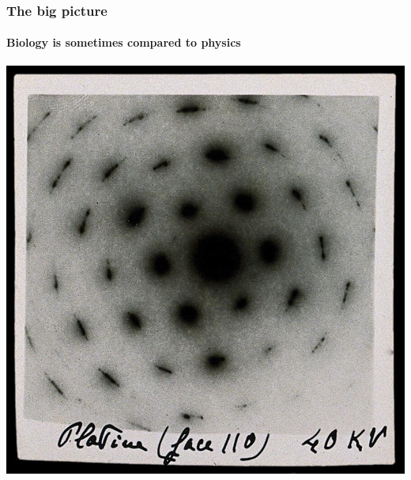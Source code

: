 {
\DarkMode
\begin{frame}
    \frametitle{The big picture}
    \framesubtitle{Biology is sometimes compared to physics}

    \begin{center}
        \includegraphics[height=0.80\textheight]{figures/JJTrillat_ElectronDiffractionPt.jpg}
    \end{center}
\end{frame}
}

